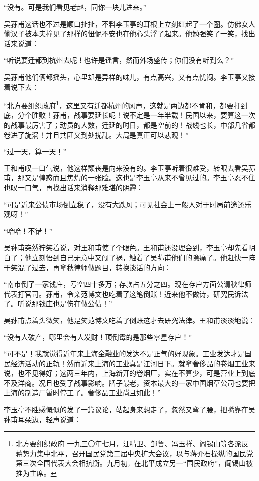 \par “没有。可是我们看见老赵，同你一块儿进来。”
\par 吴荪甫这话也不过是顺口扯扯，不料李玉亭的耳根上立刻红起了一个圈。仿佛女人偷汉子被本夫撞见了那样的忸怩不安也在他心头浮了起来。他勉强笑了一笑，找出话来说道：
\par “听说要迁都到杭州去呢！也许是谣言，然而外场盛传；你们没有听到么？”
\par 吴荪甫他们俩都摇头，心里却是异样的味儿，有点高兴，又有点忧闷。李玉亭又接着说下去：
\par “北方要组织政府\footnote{北方要组织政府 一九三〇年七月，汪精卫、邹鲁、冯玉祥、阎锡山等各派反蒋势力集中北平，召开国民党第二届中央扩大会议，以与蒋介石操纵的国民党第三次全国代表大会相抗衡。九月初，在北平成立另一“国民政府”，阎锡山被推为主席。}，这里又有迁都杭州的风声，这就是两边都不肯和，都要打到底，分个胜败！荪甫，战事要延长呢！说不定是一年半载！民国以来，要算这一次的战事最厉害了；动员的人数，迁延的时日，都是空前的！战线也长，中部几省都卷进了旋涡！并且共匪又到处扰乱。大局是真正可以悲观！”
\par “过一天，算一天！”
\par 王和甫叹一口气说，他这样颓丧是向来没有的。李玉亭听着很难受，转眼去看吴荪甫，那又是惶惑而且焦灼的一张脸。这也是李玉亭从来不曾见过的。李玉亭忍不住也叹一口气，再找出话来消释那难堪的阴霾：
\par “可是近来公债市场倒立稳了，没有大跌风；可见社会上一般人对于时局前途还乐观呀！”
\par “哈哈！不错！”
\par 吴荪甫突然狞笑着说，对王和甫使了个眼色。王和甫还没理会到，李玉亭却先看明白了；他立刻悟到自己无意中又闯了祸，触着了吴荪甫他们的隐痛了。他赶快一阵干笑混了过去，再拿秋律师做题目，转换谈话的方向：
\par “南市倒了一家钱庄，亏空四十多万；存款占五分之四。现在存户方面公请秋律师代表打官司。荪甫，令亲范博文也吃着了这笔倒账！近来他不做诗，研究民诉法了。听说那钱庄也是伤在做公债！”
\par 吴荪甫点着头微笑，他是笑范博文吃着了倒账这才去研究法律。王和甫淡淡地说：
\par “没有人破产，哪里会有人发财！顶倒霉的是那些零星存户！”
\par “可不是！我就觉得近年来上海金融业的发达不是正气的好现象。工业发达才是国民经济活动的正轨！然而近来上海的工业真是江河日下。就拿奢侈品的卷烟工业来说，也不见得好；这两三年内，上海新开的卷烟厂，实在不算少，可是营业上到底不及洋商。况且也受了战事影响。牌子最老，资本最大的一家中国烟草公司也要把上海的制造厂暂时停工了。奢侈品工业尚且如此！”
\par 李玉亭不胜感慨似的发了一篇议论，站起身来想走了，忽然又弯了腰，把嘴靠在吴荪甫耳朵边，轻声说道：
